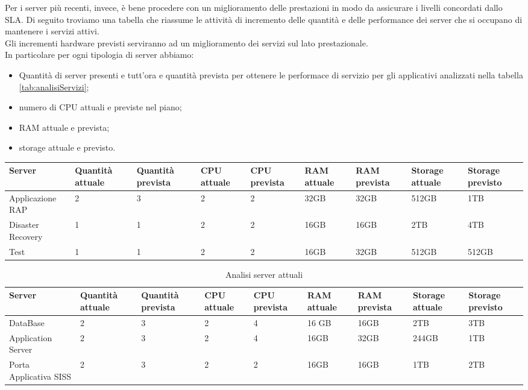 	Per i server più recenti, invece, è bene procedere con un miglioramento delle prestazioni in modo da assicurare i livelli concordati dallo SLA. Di seguito troviamo una tabella che riassume le attività di incremento delle quantità e delle performance dei server che si occupano di mantenere i servizi attivi.\\
		Gli incrementi hardware previsti serviranno ad un miglioramento dei servizi sul lato prestazionale. \\
	In particolare per ogni tipologia di server abbiamo:
	\begin{itemize}
		\item Quantità di server presenti e tutt'ora e quantità prevista per ottenere le performace di servizio per gli applicativi analizzati nella tabella \ref{tab:analisiServizi};
		\item numero di CPU attuali e previste nel piano;
		\item RAM attuale e prevista;
		\item storage attuale e previsto.
	\end{itemize}
	\begin{table}[h]
		\centering
		\begin{tabular}{|C{2cm} || C{1.5cm} | C{1.5cm}|| C{1.5cm} |C{1.5cm} || C{1.5cm} |C{1.5cm}|| C{1.5cm} |C{1.5cm}|} 
			\hline
			\textbf{Server}  &\textbf{Quantità attuale} &\textbf{Quantità prevista} & \textbf{CPU attuale} & \textbf{CPU prevista} & \textbf{RAM attuale} & \textbf{RAM prevista} & \textbf{Storage attuale} & \textbf{Storage previsto} \\ \hline
			Applicazione RAP & 2 & 3 & 2& 2& 32GB & 32GB & 512GB& 1TB \\ \hline
			Disaster Recovery & 1 & 1 & 2 & 2& 16GB& 16GB &2TB&4TB\\ \hline
			Test & 1 & 1& 2 &  2& 16GB& 32GB& 512GB&512GB\\ \hline
		\end{tabular}
	\end{table}

	\begin{table}[h]
	\centering
	\begin{tabular}{|C{2cm} || C{1.5cm} | C{1.5cm}|| C{1.5cm} |C{1.5cm} || C{1.5cm} |C{1.5cm}|| C{1.5cm} |C{1.5cm}|} 
		\hline
		\textbf{Server}  &\textbf{Quantità attuale} &\textbf{Quantità prevista} & \textbf{CPU attuale} & \textbf{CPU prevista} & \textbf{RAM attuale} & \textbf{RAM prevista} & \textbf{Storage attuale} & \textbf{Storage previsto} \\ \hline
		DataBase & 2 & 3 & 2 & 4 & 16 GB & 16GB & 2TB& 3TB\\ \hline
		Application Server & 2 & 3 & 2 & 4 & 16GB&32GB & 244GB& 1TB\\ \hline
		Porta Applicativa SISS & 2 & 3 & 2 & 2& 16GB & 16GB & 1TB& 2TB \\ \hline
	\end{tabular}
	\caption{Analisi server attuali}\label{tab:analisiServer}
\end{table}

